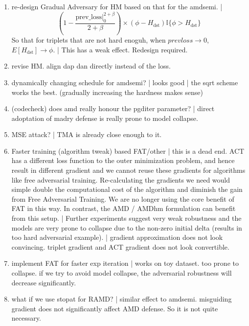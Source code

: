 \begin{enumerate}
	\item [\xmark] re-design Gradual Adversary for HM based on that for the amdsemi. |
		\[
			(1-\frac{\text{prev\_loss}|_0^{2+\beta}}{2+\beta}) \times
			(\phi - H_\text{dst})\mathbb{I}\{\phi > H_\text{dst}\}
		\]
		So that for triplets that are not hard enoguh, when
		$prevloss \rightarrow 0$, $E[H_\text{dst}]\rightarrow \phi$.
		| This has a weak effect. Redesign required.
	
	\item [\cmark] revise HM. align dap dan directly instead of the loss.

	\item [\cmark] \checkmark dynamically changing schedule for amdsemi? |
		looks good | the sqrt scheme works the best. (gradually increasing the
		hardness makes sense)

	\item [\cmark] (codecheck) does amd really honour the pgditer parameter? |
		direct adoptation of madry defense is really prone to model collapse.

	\item [\xmark] MSE attack? | TMA is already close enough to it.

	\item [\xmark] Faster training (algorithm tweak) based FAT/other | this is
		a dead end. ACT has a different loss function to the outer minimization
		problem, and hence result in different gradient and we cannot reuse
		these gradients for algorithms like free adversarial training.
		Re-calculating the gradients we need would simple double the
		computational cost of the algorithm and diminish the gain from Free
		Adversarial Training. We are no longer using the core benefit of FAT in
		this way. In contrast, the AMD / AMDhm formulation can benefit from
		this setup. | Further experiments suggest very weak robustness and the
		models are very prone to collapse due to the non-zero initial delta
		(results in too hard adversarial example).  | gradient approximation
		does not look convincing. triplet gradient and ACT gradient does not
		look convertible.

	\item [\cmark] implement FAT for faster exp iteration | works on toy
		dataset. too prone to collapse. if we try to avoid model collapse, the
		adversarial robustness will decrease significantly.

	\item [\cmark] what if we use stopat for RAMD? | similar effect to amdsemi.
		misguiding gradient does not significantly affect AMD defense. So it
		is not quite necessary.
	
\end{enumerate}
